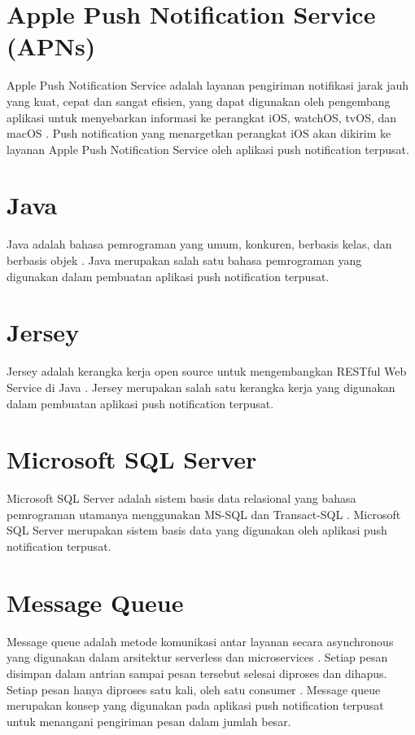 \section{Apple Push Notification Service (APNs)}
\par Apple Push Notification Service adalah layanan pengiriman notifikasi jarak jauh yang kuat, cepat dan sangat efisien, yang dapat digunakan oleh pengembang aplikasi untuk menyebarkan informasi ke perangkat iOS, watchOS, tvOS, dan macOS \cite{apns-online}. Push notification yang menargetkan perangkat iOS akan dikirim ke layanan Apple Push Notification Service oleh aplikasi push notification terpusat.

\section{Java}
\par Java adalah bahasa pemrograman yang umum, konkuren, berbasis kelas, dan berbasis objek \cite{java-online}. Java merupakan salah satu bahasa pemrograman yang digunakan dalam pembuatan aplikasi push notification terpusat.

\section{Jersey}
\par Jersey adalah kerangka kerja open source untuk mengembangkan RESTful Web Service di Java \cite{jersey-online}. Jersey merupakan salah satu kerangka kerja yang digunakan dalam pembuatan aplikasi push notification terpusat.

\section{Microsoft SQL Server}
\par Microsoft SQL Server adalah sistem basis data relasional yang bahasa pemrograman utamanya menggunakan MS-SQL dan Transact-SQL \cite{sqlserver-thesis}. Microsoft SQL Server merupakan sistem basis data yang digunakan oleh aplikasi push notification terpusat.

\section{Message Queue}
\par Message queue adalah metode komunikasi antar layanan secara asynchronous yang digunakan dalam arsitektur serverless dan microservices \cite{message-queue-online}. Setiap pesan disimpan dalam antrian sampai pesan tersebut selesai diproses dan dihapus. Setiap pesan hanya diproses satu kali, oleh satu consumer \cite{message-queue-online}. Message queue merupakan konsep yang digunakan pada aplikasi push notification terpusat untuk menangani pengiriman pesan dalam jumlah besar.

